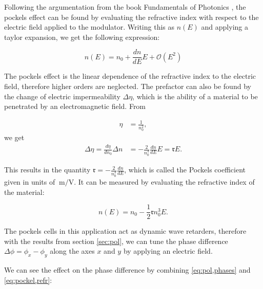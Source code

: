 Following the argumentation from the book Fundamentals of Photonics , the pockels effect can be found by evaluating the refractive index with respect to the electric field applied to the modulator. Writing this as $n(E)$ and applying a taylor expansion, we get the following expression:

\begin{equation}
	n(E) = n_0 + \frac{dn}{dE} E + \mathcal{O}(E^2)
\end{equation}


The pockels effect is the linear dependence of the refractive index to the electric field, therefore higher orders are neglected. The prefactor can also be found by the change of electric impermeability $\Delta \eta$, which is the ability of a material to be penetrated by an electromagnetic field. From

\begin{align}
	\eta & = \frac{1}{n_0^2},
\end{align}
we get
\begin{align}
	\Delta \eta = \frac{d \eta}{dn_0} \Delta n & = -\frac{2}{n_0^3} \frac{dn}{dE} E = \mathfrak{r} E .
\end{align}
\label{eq:pockel,refr}

This results in the quantity $\mathfrak{r} = -\frac{2}{n_0^3} \frac{dn}{dE}$, which is called the Pockels coefficient given in units of $\SI{}{\meter\per\volt}$. It can be measured by evaluating the refractive index of the material:

\begin{equation}
	n(E) = n_0 - \frac{1}{2} \mathfrak{r} n_0^3 E .
\end{equation}

The pockels cells in this application act as dynamic wave retarders, therefore with the results from section \ref{sec:pol}, we can tune the phase difference $\Delta \phi = \phi_x - \phi_y$ along the axes $x$ and $y$ by applying an electric field.

We can see the effect on the phase difference by combining \ref{eq:pol,phases} and \ref{eq:pockel,refr}:

